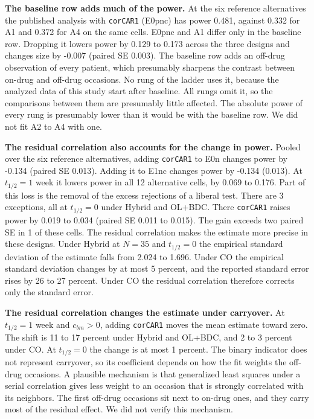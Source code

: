 \documentclass[
  11pt,
]{article}
\begin{document}
\textbf{The baseline row adds much of the power.} At the six reference
alternatives the published analysis with \texttt{corCAR1} (E0pnc) has power
0.481, against 0.332 for
A1 and 0.372 for A4 on the same cells. E0pnc and
A1 differ only in the baseline row. Dropping it lowers power
by 0.129 to 0.173 across the three
designs and changes size by -0.007 (paired SE
0.003). The baseline row adds an
off-drug observation of every patient, which presumably sharpens the
contrast between on-drug and off-drug occasions. No rung of the
ladder uses it, because the analyzed data of this study start after
baseline. All rungs omit it, so the comparisons between them are
presumably little affected. The absolute power of every rung is
presumably lower than it would be with the baseline row. We did not
fit A2 to A4 with one.

\textbf{The residual correlation also accounts for the change in power.}
Pooled over the six reference alternatives, adding \texttt{corCAR1} to E0n
changes power by -0.134 (paired SE
0.013). Adding it to E1nc changes
power by
-0.134 (0.013). At
\(t_{1/2} = 1\) week it lowers power in all 12 alternative
cells, by 0.069 to 0.176.
Part of this loss is the removal of the excess rejections of a liberal
test. There are 3 exceptions, all at
\(t_{1/2} = 0\) under Hybrid and OL+BDC. There \texttt{corCAR1} raises power by
0.019 to 0.034 (paired SE
0.011 to 0.015). The
gain exceeds two paired SE in
1 of these cells. The
residual correlation makes the estimate more precise in these
designs. Under Hybrid at \(N = 35\) and \(t_{1/2} = 0\) the
empirical standard deviation of the estimate falls from
2.024 to
1.696. Under CO
the empirical standard deviation changes by at most
5
percent, and the reported standard error rises by
26
to
27
percent. Under CO the residual correlation therefore corrects only
the standard error.

\textbf{The residual correlation changes the estimate under carryover.}
At \(t_{1/2} = 1\) week and \(c_{bm} > 0\), adding \texttt{corCAR1} moves the
mean estimate toward zero. The shift is
11
to 17 percent under Hybrid
and OL+BDC, and 2 to
3 percent under CO. At \(t_{1/2} = 0\) the
change is at most
1
percent. The binary indicator does not represent carryover, so its
coefficient depends on how the fit weights the off-drug occasions. A
plausible mechanism is that generalized least squares under a serial
correlation gives less weight to an occasion that is strongly
correlated with its neighbors. The first off-drug occasions sit next to
on-drug ones, and they carry most of the residual effect. We did not
verify this mechanism.
\end{document}
